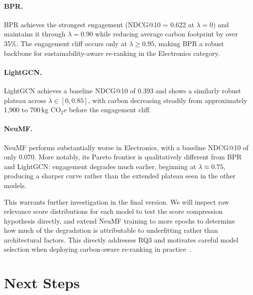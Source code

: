 \documentclass[11pt]{article}
\begin{document}
\paragraph{BPR.}
BPR achieves the strongest engagement (NDCG@10 = 0.622 at $\lambda=0$)
and maintains it through $\lambda = 0.90$ while reducing average carbon
footprint by over 35\%. The engagement cliff occurs only at
$\lambda \geq 0.95$, making BPR a robust backbone for sustainability-aware
re-ranking in the Electronics category.

\paragraph{LightGCN.}
LightGCN achieves a baseline NDCG@10 of 0.393 and shows a similarly
robust plateau across $\lambda \in [0, 0.85]$, with carbon decreasing
steadily from approximately 1{,}900 to 700\,kg CO$_2$e before the
engagement cliff.

\paragraph{NeuMF.}
NeuMF performs substantially worse in Electronics, with a baseline
NDCG@10 of only 0.070. More notably, its Pareto frontier is qualitatively
different from BPR and LightGCN: engagement degrades much earlier,
beginning at $\lambda \approx 0.75$, producing a sharper curve rather
than the extended plateau seen in the other models.

This warrants further investigation in the final version. We will inspect
raw relevance score distributions for each model to test the score
compression hypothesis directly, and extend NeuMF training to more epochs
to determine how much of the degradation is attributable to underfitting
rather than architectural factors. This directly addresses RQ3 and
motivates careful model selection when deploying carbon-aware re-ranking
in practice~\cite{chaney2018confounding}.

\section{Next Steps}
\end{document}
